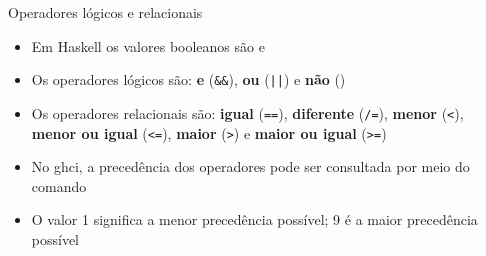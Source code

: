 \begin{frame}[fragile]{Operadores lógicos e relacionais}

    \begin{itemize}
        \item Em Haskell os valores booleanos são  e 

        \item Os operadores lógicos são: \textbf{e} (\texttt{\&\&}), \textbf{ou} (\texttt{||}) e
            \textbf{não} ()

        \item Os operadores relacionais são: \textbf{igual} (\texttt{==}), \textbf{diferente}
            (\texttt{/=}), \textbf{menor} (\texttt{<}), \textbf{menor ou igual} (\texttt{<=}),
            \textbf{maior} (\texttt{>}) e \textbf{maior ou igual} (\texttt{>=})

        \item No ghci, a precedência dos operadores pode ser consultada por meio do comando

        \item O valor 1 significa a menor precedência possível; 9 é a maior precedência possível

        
    \end{itemize}

\end{frame}

